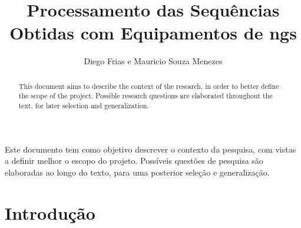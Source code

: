 \documentclass[12pt]{article}
\title{Processamento das Sequências Obtidas com Equipamentos de \gls{ngs}}
\author{Diego Frias e Mauricio Souza Menezes\\}
\begin{document}

\maketitle

\begin{resumo}
    Este documento tem como objetivo descrever o contexto da pesquisa, com vistas a definir melhor o escopo do projeto. Possíveis questões de pesquisa são elaboradas ao longo do texto, para uma posterior seleção e generalização.
\end{resumo}


\begin{abstract}
    \begin{otherlanguage}{english}
        This document aims to describe the context of the research, in order to better define the scope of the project. Possible research questions are elaborated throughout the text, for later selection and generalization.
    \end{otherlanguage} 
\end{abstract}


\section{Introdução}
\end{document}
